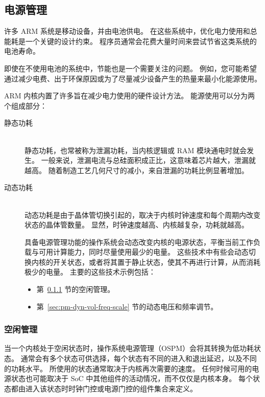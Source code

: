 \subsection{电源管理}

许多 ARM 系统是移动设备，并由电池供电。
在这些系统中，优化电力使用和总能耗是一个关键的设计约束。
程序员通常会花费大量时间来尝试节省这类系统的电池寿命。

即使在不使用电池的系统中，节能也是一个需要关注的问题。
例如，您可能希望通过减少电费、出于环保原因或为了尽量减少设备产生的热量来最小化能源使用。

ARM 内核内置了许多旨在减少电力使用的硬件设计方法。
能源使用可以分为两个组成部分：

\begin{description}
    \item[静态功耗] \hfill \\
    静态功耗，也常被称为泄漏功耗，当内核逻辑或 RAM 模块通电时就会发生。
    一般来说，泄漏电流与总硅面积成正比，这意味着芯片越大，泄漏就越高。
    随着制造工艺几何尺寸的减小，来自泄漏的功耗比例显著增加。
    \item[{动态功耗}] \hfill \\
    动态功耗是由于晶体管切换引起的，取决于内核时钟速度和每个周期内改变状态的晶体管数量。
    显然，时钟速度越高、内核越复杂，功耗就越高。

    具备电源管理功能的操作系统会动态改变内核的电源状态，平衡当前工作负载与可用计算能力，同时尽量使用最少的电量。
    这些技术中有些会动态切换内核的开关状态，或者将其置于静止状态，使其不再进行计算，从而消耗极少的电量。
    主要的这些技术示例包括：
    \begin{itemize}
      \item
        第~\ref{sec:pm-idle-man} 节的空闲管理。
      \item
        第~\ref{sec:pm-dyn-vol-freq-scale} 节的动态电压和频率调节。
    \end{itemize}
\end{description}

\subsubsection{空闲管理}\label{sec:pm-idle-man}

当一个内核处于空闲状态时，操作系统电源管理（OSPM）会将其转换为低功耗状态。
通常会有多个状态可供选择，每个状态有不同的进入和退出延迟，以及不同的功耗水平。
所使用的状态通常取决于内核再次需要的速度。
任何时候可用的电源状态也可能取决于 SoC 中其他组件的活动情况，而不仅仅是内核本身。
每个状态都由进入该状态时时钟门控或电源门控的组件集合来定义。

